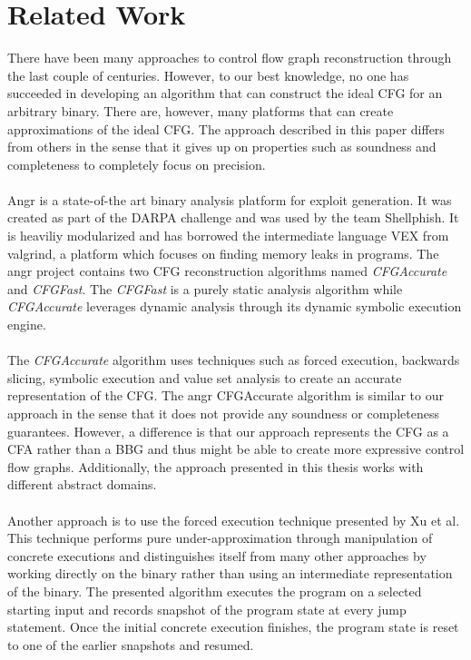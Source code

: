 \documentclass{kththesis}
\begin{document}
\section{Related Work}
There have been many approaches to control flow graph reconstruction through the last couple of centuries. However, to our best knowledge, no one has succeeded in developing an algorithm that can construct the ideal CFG for an arbitrary binary. There are, however, many platforms that can create approximations of the ideal CFG. The approach described in this paper differs from others in the sense that it gives up on properties such as soundness and completeness to completely focus on precision. 
\\ \\
Angr\cite{angr} is a state-of-the art binary analysis platform for exploit generation. It was created as part of the DARPA challenge and was used by the team Shellphish. It is heaviliy modularized and has borrowed the intermediate language VEX from valgrind, a platform which focuses on finding memory leaks in programs. The angr project contains two CFG reconstruction algorithms named \textit{CFGAccurate} and \textit{CFGFast}. The \textit{CFGFast} is a purely static analysis algorithm while \textit{CFGAccurate} leverages dynamic analysis through its dynamic symbolic execution engine. 
\\ \\
The \textit{CFGAccurate} algorithm uses techniques such as forced execution, backwards slicing, symbolic execution and value set analysis to create an accurate representation of the CFG. The angr CFGAccurate algorithm is similar to our approach in the sense that it does not provide any soundness or completeness guarantees. However, a difference is that our approach represents the CFG as a CFA rather than a BBG and thus might be able to create more expressive control flow graphs. Additionally, the approach presented in this thesis works with different abstract domains.
\\ \\
Another approach is to use the forced execution technique presented by Xu et al\cite{preciseCFG}. This technique performs pure under-approximation through manipulation of concrete executions and distinguishes itself from many other approaches by working directly on the binary rather than using an intermediate representation of the binary. The presented algorithm executes the program on a selected starting input and records snapshot of the program state at every jump statement. Once the initial concrete execution finishes, the program state is reset to one of the earlier snapshots and resumed. 
\end{document}
